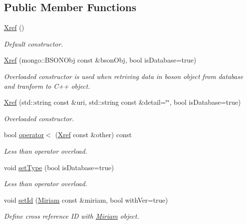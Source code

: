 \subsection*{Public Member Functions}
\begin{DoxyCompactItemize}
\item 
\hyperlink{classunisys_1_1Xref_a44813d6fdb5f9e53673812b9ebac2437}{Xref} ()
\begin{DoxyCompactList}\small\item\em Default constructor. \end{DoxyCompactList}\item 
\hyperlink{classunisys_1_1Xref_ac3de9eaba3dd45e75b3544af841d9f55}{Xref} (mongo\-::\-B\-S\-O\-N\-Obj const \&bson\-Obj, bool is\-Database=true)
\begin{DoxyCompactList}\small\item\em Overloaded constructor is used when retriving data in boson object from database and tranform to C++ object. \end{DoxyCompactList}\item 
\hyperlink{classunisys_1_1Xref_aa1da5b743e2e30b240aef9e95c530b0e}{Xref} (std\-::string const \&uri, std\-::string const \&detail=\char`\"{}\char`\"{}, bool is\-Database=true)
\begin{DoxyCompactList}\small\item\em Overloaded constructor. \end{DoxyCompactList}\item 
bool \hyperlink{classunisys_1_1Xref_a8a61152e215a60c459776e1c02955c32}{operator$<$} (\hyperlink{classunisys_1_1Xref}{Xref} const \&other) const 
\begin{DoxyCompactList}\small\item\em Less than operator overload. \end{DoxyCompactList}\item 
void \hyperlink{classunisys_1_1Xref_a4dfa4307eb47f62fb4b403095a0814d6}{set\-Type} (bool is\-Database=true)
\begin{DoxyCompactList}\small\item\em Less than operator overload. \end{DoxyCompactList}\item 
void \hyperlink{classunisys_1_1Xref_ada98dc86c0900918728bf131d18c95e6}{set\-Id} (\hyperlink{classunisys_1_1Miriam}{Miriam} const \&miriam, bool with\-Ver=true)
\begin{DoxyCompactList}\small\item\em Define cross reference I\-D with \hyperlink{classunisys_1_1Miriam}{Miriam} object. \end{DoxyCompactList}\item 

\end{DoxyCompactItemize}
